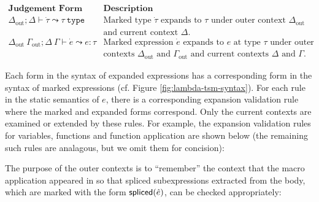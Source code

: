 \begin{enumerate}
$\begin{array}{ll}
\textbf{Judgement Form} & \textbf{Description}\\
\Delta_\text{out}; \Delta \vdash \dot{\tau} \leadsto \tau~\mathtt{type} & \text{Marked type $\dot{\tau}$ expands to $\tau$ under outer context $\Delta_\text{out}$}\\
& \text{and current context $\Delta$.}\\
\Delta_\text{out}~\Gamma_\text{out}; \Delta~\Gamma \vdash \dot{e} \leadsto e : \tau & \text{Marked expression $\dot{e}$ expands to $e$ at type $\tau$ under outer}\\
& \text{contexts $\Delta_\text{out}$ and $\Gamma_\text{out}$ and current contexts $\Delta$ and $\Gamma$.}
\end{array}$

Each form in the syntax of expanded expressions has a corresponding form in the syntax of marked expressions (cf. Figure \ref{fig:lambda-tsm-syntax}). For each rule in the static semantics of $e$, there is a corresponding expansion validation rule where the marked and expanded forms correspond. Only the current contexts are examined or extended by these rules. For example, the expansion validation rules for variables, functions and function application are shown below (the remaining such rules are analagous, but we omit them for concision):
\begin{mathpar}


\end{mathpar}

The purpose of the outer contexts is to ``remember'' the context that the macro application appeared in so that spliced subexpressions extracted from the body, which are marked with the form $\mathsf{spliced}(\ue)$, can be checked appropriately:
\begin{mathpar}
\end{mathpar}


\end{enumerate}
